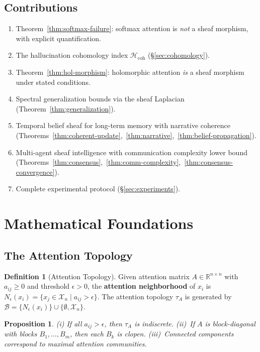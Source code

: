 \documentclass[11pt,a4paper]{article}
\theoremstyle{plain}
\newtheorem{proposition}[theorem]{Proposition}
\theoremstyle{definition}
\newtheorem{definition}[theorem]{Definition}
\theoremstyle{remark}
\newcommand{\R}{\mathbb{R}}
\newcommand{\cX}{\mathcal{X}}
\newcommand{\Hcoh}{\mathcal{H}_{\mathrm{coh}}}
\begin{document}
\subsection{Contributions}
\begin{enumerate}[nosep]
\item Theorem~\ref{thm:softmax-failure}: softmax attention is \emph{not} a sheaf morphism, with explicit quantification.
\item The hallucination cohomology index $\Hcoh$ (\S\ref{sec:cohomology}).
\item Theorem~\ref{thm:hol-morphism}: holomorphic attention \emph{is} a sheaf morphism under stated conditions.
\item Spectral generalization bounds via the sheaf Laplacian (Theorem~\ref{thm:generalization}).
\item Temporal belief sheaf for long-term memory with narrative coherence (Theorems~\ref{thm:coherent-update},~\ref{thm:narrative},~\ref{thm:belief-propagation}).
\item Multi-agent sheaf intelligence with communication complexity lower bound (Theorems~\ref{thm:consensus},~\ref{thm:comm-complexity},~\ref{thm:consensus-convergence}).
\item Complete experimental protocol (\S\ref{sec:experiments}).
\end{enumerate}

\section{Mathematical Foundations}\label{sec:foundations}

\subsection{The Attention Topology}

\begin{definition}[Attention Topology]\label{def:attn-topology}
Given attention matrix $A \in \R^{n \times n}$ with $a_{ij} \geq 0$ and threshold $\epsilon > 0$, the \textbf{attention neighborhood} of $x_i$ is $N_\epsilon(x_i) = \{x_j \in \cX_n \mid a_{ij} > \epsilon\}$. The attention topology $\tau_A$ is generated by $\mathcal{B} = \{N_\epsilon(x_i)\} \cup \{\emptyset, \cX_n\}$.
\end{definition}

\begin{proposition}\label{prop:attn-topology}
(i) If all $a_{ij} > \epsilon$, then $\tau_A$ is indiscrete. (ii)~If $A$ is block-diagonal with blocks $B_1, \ldots, B_m$, then each $B_k$ is clopen. (iii)~Connected components correspond to maximal attention communities.
\end{proposition}
\end{document}
